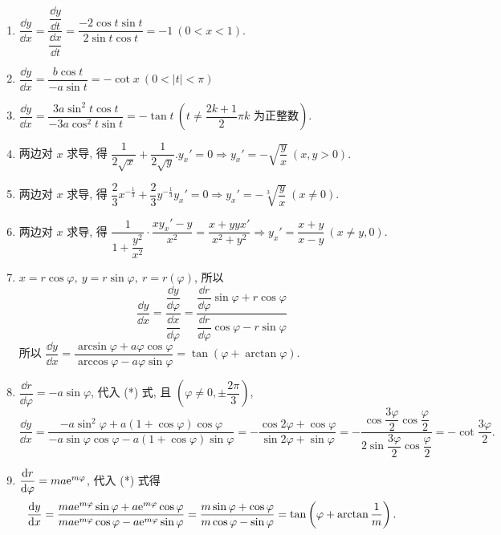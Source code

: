\begin{solution}
    \begin{enumerate}[label=(\arabic{*})]
        \item $\dfrac{\dd y}{\dd x}=\dfrac{\dfrac{\dd y}{\dd t}}{\dfrac{\dd x}{\dd t}}=\dfrac{-2\cos t\sin t}{2\sin t\cos t}=-1~  ( 0 <x < 1). $
        \item $\dfrac{\dd y}{\dd x}=\dfrac{b\cos t}{-a\sin t}=-\cot x~  ( 0 <\left| t\right|  < \pi ) $
        \item $\dfrac{\dd y}{\dd x}=\dfrac{3a\sin ^{2}t\cos t}{-3a\cos ^{2}t\sin t}=-\tan t~  ( t\neq  \dfrac{2k+1}{2}\pi k\text{ 为正整数}) .$
        \item 两边对 $x$ 求导, 得 $\dfrac{1}{2\sqrt{x}}+\dfrac{1}{2\sqrt{y}}.y_{x}'=0\Rightarrow y_{x}'=-\sqrt{\dfrac{y}{x}}~  ( x,y > 0) .$
        \item 两边对 $x$ 求导, 得 $\dfrac{2}{3}x^{-\frac{1}{3}}+\dfrac{2}{3}y^{-\frac{1}{3}}y_{x}'=0\Rightarrow y_{x}'=-\sqrt[3] {\dfrac{y}{x}}~  ( x\neq  0) .$
        \item 两边对 $x$ 求导, 得 $\dfrac{1}{1+\dfrac{y^{2}}{x^{2}}}\cdot \dfrac{xy_{x}'-y}{x^{2}}=\dfrac{x+yyx'}{x^{2}+y^{2}}\Rightarrow y_{x}'=\dfrac{x+y}{x-y}~  ( x\neq  y,0) .$
        \item $x=r\cos\varphi,~y=r\sin\varphi,~r=r(\varphi)$, 所以
              \begin{equation}
                  \dfrac{\dd y}{\dd x}=\dfrac{\dfrac{\dd y}{\dd \varphi }}{\dfrac{\dd x}{\dd \varphi }}=\dfrac{\dfrac{\dd r}{\dd \varphi }\sin \varphi +r\cos \varphi }{\dfrac{\dd r}{\dd \varphi }\cos \varphi -r\sin \varphi }\tag{*}
              \end{equation}
              所以 $\dfrac{\dd y}{\dd x}=\dfrac{\arcsin \varphi +a\varphi \cos \varphi }{\arccos \varphi -a\varphi \sin \varphi }=\tan \left( \varphi +\arctan \varphi \right) .$
        \item $\dfrac{\dd r}{\dd \varphi}=-a\sin\varphi$, 代入 (*) 式, 且 $(\varphi\neq0,\pm\dfrac{2\pi}{3})$, 
              $$\dfrac{\dd y}{\dd x}=\dfrac{-a\sin ^{2}\varphi +a\left( 1+\cos \varphi \right) \cos \varphi }{-a\sin \varphi \cos \varphi -a\left( 1+\cos \varphi \right) \sin \varphi }=-\dfrac{\cos 2\varphi +\cos \varphi }{\sin 2\varphi +\sin \varphi }=-\dfrac{\cos \dfrac{3\varphi }{2}\cos \dfrac{\varphi }{2}}{2\sin \dfrac{3\varphi }{2}\cos \dfrac{\varphi }{2}}=-\cot\dfrac{3\varphi}{2}.$$
        \item $\dfrac{\dd r}{\dd \varphi }=ma\mathrm{e} ^{m\varphi }$, 代入 (*) 式得
              $$\dfrac{\dd y}{\dd x}=\dfrac{ma\mathrm{e} ^{m\varphi }\sin \varphi +a\mathrm{e} ^{m\varphi }\cos \varphi }{ma\mathrm{e} ^{m\varphi }\cos \varphi -a\mathrm{e} ^{m\varphi }\sin \varphi }=\dfrac{m\sin \varphi +\cos \varphi }{m\cos \varphi -\sin \varphi }=\tan \left( \varphi +\arctan \dfrac{1}{m}\right) .$$
    \end{enumerate}
\end{solution}

